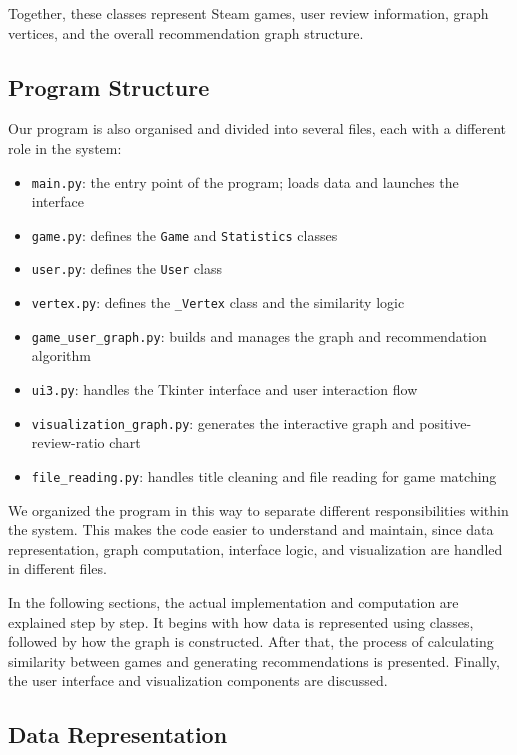 \documentclass[fontsize=11pt]{article}
\begin{document}
Together, these classes represent Steam games, user review information, graph vertices, and the overall recommendation graph structure.

\subsection{Program Structure}

Our program is also organised and divided into several files, each with a different role in the system:
\begin{itemize}
    \item \texttt{main.py}: the entry point of the program; loads data and launches the interface
    \item \texttt{game.py}: defines the \texttt{Game} and \texttt{Statistics} classes
    \item \texttt{user.py}: defines the \texttt{User} class
    \item \texttt{vertex.py}: defines the \texttt{\_Vertex} class and the similarity logic
    \item \texttt{game\_user\_graph.py}: builds and manages the graph and recommendation algorithm
    \item \texttt{ui3.py}: handles the Tkinter interface and user interaction flow
    \item \texttt{visualization\_graph.py}: generates the interactive graph and positive-review-ratio chart
    \item \texttt{file\_reading.py}: handles title cleaning and file reading for game matching
\end{itemize}

We organized the program in this way to separate different responsibilities within the system. This makes the code easier to understand and maintain, since data representation, graph computation, interface logic, and visualization are handled in different files.

In the following sections, the actual implementation and computation are explained step by step. It begins with how data is represented using classes, followed by how the graph is constructed. After that, the process of calculating similarity between games and generating recommendations is presented. Finally, the user interface and visualization components are discussed.

\newpage

\subsection{Data Representation}
\end{document}
